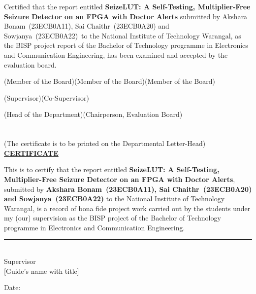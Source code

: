 \documentclass[12pt,a4paper,oneside]{report}
\newcommand{\projtitle}{SeizeLUT: A Self-Testing, Multiplier-Free Seizure Detector on an FPGA with Doctor Alerts}
\newcommand{\studentA}{Akshara Bonam}
\newcommand{\rollA}{23ECB0A11}
\newcommand{\studentB}{Sai Chaithr}
\newcommand{\rollB}{23ECB0A20}
\newcommand{\studentC}{Sowjanya}
\newcommand{\rollC}{23ECB0A22}
\newcommand{\students}{\studentA\ (\rollA), \studentB\ (\rollB) and \studentC\ (\rollC)}
\newcommand{\guide}{[Guide's name with title]}
\newcommand{\dept}{Electronics and Communication Engineering}
\begin{document}
\vspace{8mm}
Certified that the report entitled \textbf{\projtitle} submitted by \students\ to the National Institute of
Technology Warangal, as the BISP project report of the Bachelor of Technology programme in \dept, has been examined
and accepted by the evaluation board.

\vspace{30mm}
\noindent(Member of the Board)\hfill(Member of the Board)\hfill(Member of the Board)

\vspace{30mm}
\noindent(Supervisor)\hfill(Co-Supervisor)

\vspace{30mm}
\noindent(Head of the Department)\hfill(Chairperson, Evaluation Board)

\chapter*{}
\thispagestyle{plain}
\vspace{-30mm}
\begin{center}
(The certificate is to be printed on the Departmental Letter-Head)\\[14mm]
{\large\bfseries\underline{CERTIFICATE}}
\end{center}
\vspace{8mm}
This is to certify that the report entitled \textbf{\projtitle}, submitted by \textbf{\students} to the
National Institute of Technology Warangal, is a record of bona fide project work carried out by the students under
my (our) supervision as the BISP project of the Bachelor of Technology programme in \dept.

\vspace{40mm}
\noindent\rule{60mm}{0.4pt}\\
\hspace*{14mm}Supervisor\\
\hspace*{4mm}\guide

\vspace{15mm}
\noindent Date:

\end{document}
